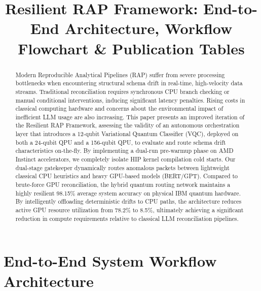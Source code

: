 \documentclass[journal]{IEEEtran}
\begin{document}
\title{Resilient RAP Framework: End-to-End Architecture, Workflow Flowchart \& Publication Tables}
\maketitle

\begin{abstract}
Modern Reproducible Analytical Pipelines (RAP) suffer from severe processing bottlenecks when encountering structural schema drift in real-time, high-velocity data streams. Traditional reconciliation requires synchronous CPU branch checking or manual conditional interventions, inducing significant latency penalties. Rising costs in classical computing hardware and concerns about the environmental impact of inefficient LLM usage are also increasing. This paper presents an improved iteration of the Resilient RAP Framework, assessing the validity of an autonomous orchestration layer that introduces a 12-qubit Variational Quantum Classifier (VQC), deployed on both a 24-qubit QPU and a 156-qubit QPU, to evaluate and route schema drift characteristics on-the-fly. By implementing a dual-run pre-warmup phase on AMD Instinct accelerators, we completely isolate HIP kernel compilation cold starts. Our dual-stage gatekeeper dynamically routes anomalous packets between lightweight classical CPU heuristics and heavy GPU-based models (BERT/GPT). Compared to brute-force GPU reconciliation, the hybrid quantum routing network maintains a highly resilient 98.15\% average system accuracy on physical IBM quantum hardware. By intelligently offloading deterministic drifts to CPU paths, the architecture reduces active GPU resource utilization from 78.2\% to 8.5\%, ultimately achieving a significant reduction in compute requirements relative to classical LLM reconciliation pipelines.
\end{abstract}

\section{End-to-End System Workflow Architecture}
\end{document}
